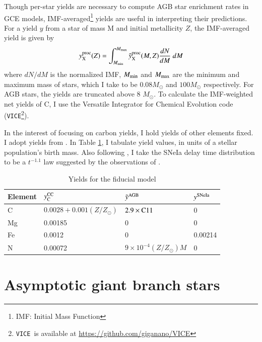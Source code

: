 \documentclass[12pt,oneside]{report}
\newcommand{\VICE}{\texttt{VICE}}
\newcommand{\Ycc}{\ensuremath{y_{\rm C}^{\rm CC}}}
\newcommand{\sun}{\ensuremath{\odot}}
\begin{document}
Though per-star yields are necessary to compute AGB star enrichment rates in GCE models, IMF-averaged\footnote{IMF: Initial Mass Function} yields are useful in interpreting their predictions. For a yield $y$ from a star of mass M and initial metallicity $Z$, the IMF-averaged yield is given by 
\begin{equation} \label{eq:imf-yield}
    y_{\rm X}^{\rm proc}(Z) = 
    \int_{M_{\rm min}}^{M_{\rm max}} 
    \tilde{y}_{\rm X}^{\rm proc}(M, Z)
    \frac{dN}{dM}  \ dM
\end{equation}
where ${dN}/{dM}$ is the normalized IMF, $M_{\rm min}$ and $M_{\rm max}$ are the minimum and maximum mass of stars, which I take to be $0.08 M_{\sun}$ and $100 M_{\sun}$ respectively. For AGB stars, the yields are truncated above 8 $M_{\odot}$. 
To calculate the IMF-weighted net yields of C, I use the Versatile Integrator for Chemical Evolution code (\VICE\footnote{\VICE~is available at \url{https://github.com/giganano/VICE}}).

In the interest of focusing on carbon yields, I hold yields of other elements fixed. 
I adopt yields from \citet{james+21, james+22}.
In Table \ref{tab:fiducial_mod}, I tabulate yield values, in units of a stellar population's birth mass.
Also following \citet{james+21, james+22}, I take the SNeIa delay time distribution to be a
$t^{-1.1}$ law suggested by the observations of \citet{maoz+12}.


\begin{table}
	\centering
    \caption[Fiducial Model]{Yields for the fiducial model}
	\label{tab:fiducial_mod}

	\begin{tabular}{l l l l}
		\toprule
        Element & $\Ycc$ & $\tilde{y}^{\rm AGB}$ & $y^{\rm SNe Ia}$ \\
		\midrule
        C & $0.0028 + 0.001(Z/Z_\odot)$ & $2.9\times{\rm C11}$ &  0 \\
        Mg & 0.00185 & 0 & 0 \\
        Fe & 0.0012 & 0 & 0.00214 \\
        N & 0.00072 & $9\times10^{-4}(Z/Z_\odot)M$ & 0\\
		\bottomrule
	\end{tabular}
\end{table}

\section{Asymptotic giant branch stars}\label{sec:agb}
\end{document}
